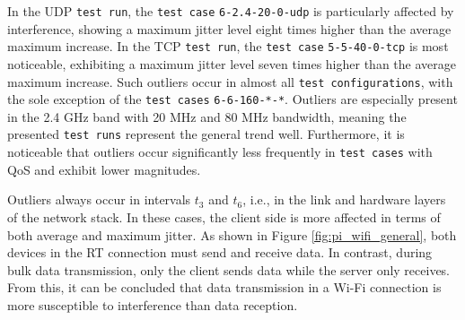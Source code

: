 In the \ac{UDP} \texttt{test run}, the \texttt{test case} \texttt{6-2.4-20-0-udp} is particularly affected by interference, showing a maximum jitter level eight times higher than the average maximum increase.  
In the \ac{TCP} \texttt{test run}, the \texttt{test case} \texttt{5-5-40-0-tcp} is most noticeable, exhibiting a maximum jitter level seven times higher than the average maximum increase.  
Such outliers occur in almost all \texttt{test configurations}, with the sole exception of the \texttt{test cases} \texttt{6-6-160-*-*}.  
Outliers are especially present in the 2.4 GHz band with 20 MHz and 80 MHz bandwidth, meaning the presented \texttt{test runs} represent the general trend well.  
Furthermore, it is noticeable that outliers occur significantly less frequently in \texttt{test cases} with \ac{QoS} and exhibit lower magnitudes.  

Outliers always occur in intervals $t_3$ and $t_6$, i.e., in the link and hardware layers of the network stack.  
In these cases, the client side is more affected in terms of both average and maximum jitter.  
As shown in Figure \ref{fig:pi_wifi_general}, both devices in the RT connection must send and receive data.  
In contrast, during bulk data transmission, only the client sends data while the server only receives.  
From this, it can be concluded that data transmission in a Wi-Fi connection is more susceptible to interference than data reception.  

